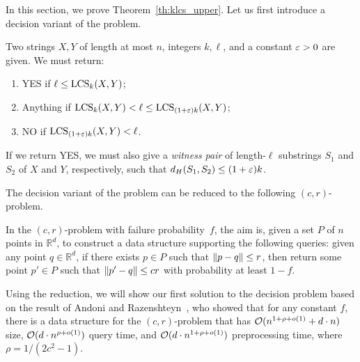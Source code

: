 In this section, we prove Theorem~\ref{th:klcs_upper}. Let us first introduce a decision variant of the \kApproxLCS problem. 

\begin{problem}\label{pr:LCS'k-decision}
Two strings $X, Y$ of length at most $n$, integers $k, \ell$, and a constant $\varepsilon > 0$ are given. We must return:
%
\begin{enumerate}
\item YES if $\ell \le \mathrm{LCS}_{k}(X,Y)$;
\item Anything if $\mathrm{LCS}_{k}(X,Y) < \ell \le \mathrm{LCS}_{(1+\varepsilon)k}(X,Y)$; 
\item NO if $\mathrm{LCS}_{(1+\varepsilon)k}(X,Y) < \ell$.
\end{enumerate}
%
If we return YES, we must also give a \emph{witness pair} of length-$\ell$ substrings $S_1$ and $S_2$ of $X$ and $Y$, respectively, such that $d_H(S_1,S_2)\le (1+\varepsilon)k$. 
\end{problem}

The decision variant of the \kApproxLCS problem can be reduced to the following $(c,r)$-\NN problem. 

\begin{problem}\label{pr:NN}
In the $(c,r)$-\NN problem with failure probability~$f$, the aim is, given a set $P$ of $n$ points in $\mathbb{R}^d$, to construct a data structure supporting the following queries: given any point $q\in \mathbb{R}^d$, if there exists $p \in P$ such that $\lVert p-q\rVert \leq r$, then return some point $p' \in P$ such that $\lVert p'-q\rVert \leq cr$ with probability at least $1-f$.
\end{problem}

Using the reduction, we will show our first solution to the \kApproxLCS decision problem based on the result of Andoni and Razenshteyn~\cite{DBLP:conf/stoc/AndoniR15}, who showed that for any constant $f$, there is a data structure for the $(c,r)$-\NN problem that has $\mathcal{O}(n^{1+\rho+o(1)}+d \cdot n)$ size, $\mathcal{O}(d\cdot n^{\rho+o(1)})$ query time, and $\mathcal{O}(d \cdot n^{1+\rho+o(1)})$ preprocessing time, where $\rho = 1/(2c^2-1)$.

